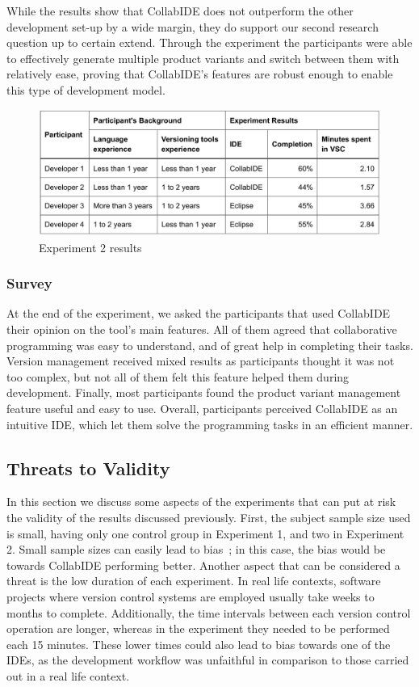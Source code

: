 While the results show that CollabIDE does not outperform the other development set-up by a wide 
margin, they do support our second research question up to certain extend. Through the experiment 
the participants were able to effectively generate multiple product variants and switch between them 
with relatively ease, proving that CollabIDE's features are robust enough to enable this type of 
development model.

\begin{figure}[htbp]
  \centering
  \includegraphics[width=1\textwidth]{img/resultsTableProductLine}
  \caption{Experiment 2 results}
  \label{fig:resultsTableProductLine}
\end{figure}

\subsubsection{Survey}
At the end of the experiment, we asked the participants that used CollabIDE their opinion on the tool's 
main features. All of them agreed that collaborative programming was easy to understand, and of great 
help in completing their tasks. Version management received mixed results as participants thought it 
was not too complex, but not all of them felt this feature helped them during development. Finally, most participants found the product variant management feature useful and easy to use. Overall, 
participants perceived CollabIDE as an intuitive IDE, which let them solve the programming tasks in an 
efficient manner. 

\subsection{Threats to Validity}
In this section we discuss some aspects of the experiments that can put at risk the validity of the 
results discussed previously. First, the subject sample size used is small, having only one control group 
in Experiment 1, and two in Experiment 2. Small sample sizes can easily lead to 
bias~\cite{threatstoval}; in this case, the bias would be towards CollabIDE performing better. Another 
aspect that can be considered a threat is the low duration of each experiment. In real life contexts, 
software projects where version control systems are employed usually take weeks to months to 
complete. Additionally, the time intervals between each version control operation are longer, whereas 
in the experiment they needed to be performed each 15 minutes. These lower times could also lead to 
bias towards one of the IDEs, as the development workflow was unfaithful in comparison to those 
carried out in a real life context. 


\endinput
